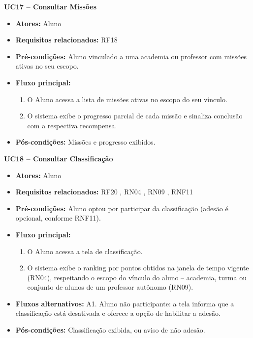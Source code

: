 \noindent\textbf{UC17 -- Consultar Missões}
\begin{itemize}[leftmargin=*, itemsep=0pt, topsep=2pt]
  \item \textbf{Atores:} Aluno
  \item \textbf{Requisitos relacionados:} RF18
  \item \textbf{Pré-condições:} Aluno vinculado a uma academia ou professor com missões ativas no seu escopo.
  \item \textbf{Fluxo principal:}
  \begin{enumerate}[label=\arabic*., itemsep=0pt, topsep=0pt]
    \item O Aluno acessa a lista de missões ativas no escopo do seu vínculo.
    \item O sistema exibe o progresso parcial de cada missão e sinaliza conclusão com a respectiva recompensa.
  \end{enumerate}
  \item \textbf{Pós-condições:} Missões e progresso exibidos.
\end{itemize}
\medskip

\noindent\textbf{UC18 -- Consultar Classificação}
\begin{itemize}[leftmargin=*, itemsep=0pt, topsep=2pt]
  \item \textbf{Atores:} Aluno
  \item \textbf{Requisitos relacionados:} RF20 , RN04 , RN09 , RNF11
  \item \textbf{Pré-condições:} Aluno optou por participar da classificação (adesão é opcional, conforme RNF11).
  \item \textbf{Fluxo principal:}
  \begin{enumerate}[label=\arabic*., itemsep=0pt, topsep=0pt]
    \item O Aluno acessa a tela de classificação.
    \item O sistema exibe o ranking por pontos obtidos na janela de tempo vigente (RN04), respeitando o escopo do vínculo do aluno -- academia, turma ou conjunto de alunos de um professor autônomo (RN09).
  \end{enumerate}
  \item \textbf{Fluxos alternativos:} A1. Aluno não participante: a tela informa que a classificação está desativada e oferece a opção de habilitar a adesão.
  \item \textbf{Pós-condições:} Classificação exibida, ou aviso de não adesão.
\end{itemize}
\medskip

